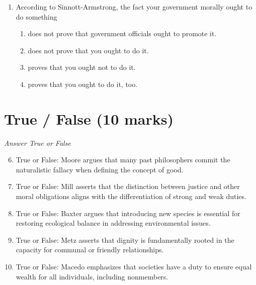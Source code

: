 \documentclass[12pt]{article}
\begin{document}
\begin{enumerate}[label=\arabic*.]
\begin{enumerate}[label=(\alph*)]
    \item there is no difference between combatants and noncombatants.
    \item the difference between combatants and noncombatants is largely ambiguous.
    \item the difference between combatants and noncombatants is categorical and clear.
\end{enumerate}
\item According to Sinnott-Armstrong, the fact your government morally ought to do something
\begin{enumerate}[label=(\alph*)]
    \item does not prove that government officials ought to promote it.
    \item does not prove that you ought to do it.
    \item proves that you ought not to do it.
    \item proves that you ought to do it, too.
\end{enumerate}
\end{enumerate}

\section*{True / False (10 marks)}
\textit{Answer True or False}
\begin{enumerate}[label=\arabic*.]
\setcounter{enumi}{5}
\item True or False: Moore argues that many past philosophers commit the naturalistic fallacy when defining the concept of good.
\item True or False: Mill asserts that the distinction between justice and other moral obligations aligns with the differentiation of strong and weak duties.
\item True or False: Baxter argues that introducing new species is essential for restoring ecological balance in addressing environmental issues.
\item True or False: Metz asserts that dignity is fundamentally rooted in the capacity for communal or friendly relationships.
\item True or False: Macedo emphasizes that societies have a duty to ensure equal wealth for all individuals, including nonmembers.
\end{enumerate}
\end{document}
